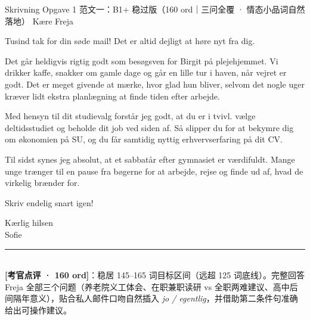 \begin{emailbox}{Skrivning Opgave 1 范文一：B1+ 稳过版（160 ord｜三问全覆 · 情态小品词自然落地）}
Kære Freja

\vspace{0.25em}
Tusind tak for din søde mail! Det er  altid dejligt at høre nyt fra dig.

\vspace{0.25em}
Det går heldigvis rigtig godt som besøgsven for Birgit på plejehjemmet. Vi drikker kaffe, snakker om gamle dage og går en lille tur i haven, når vejret er godt. Det er  meget givende at mærke, hvor glad hun bliver, selvom det nogle uger kræver lidt ekstra planlægning at finde tiden efter arbejde.

\vspace{0.25em}
Med hensyn til dit studievalg forstår jeg godt, at du er i tvivl.  vælge deltidsstudiet og beholde dit job ved siden af. Så slipper du  for at bekymre dig om økonomien på SU, og du får samtidig nyttig erhvervserfaring på dit CV.

\vspace{0.25em}
Til sidst synes jeg absolut, at et sabbatår efter gymnasiet er værdifuldt. Mange unge trænger til en pause fra bøgerne for at arbejde, rejse og finde ud af, hvad de virkelig brænder for.

\vspace{0.25em}
Skriv endelig snart igen!

\vspace{0.25em}
Kærlig hilsen\\
Sofie

\vspace{0.3em}
\rule{\linewidth}{0.4pt}\\[0.2em]
\small\textbf{\color{NCDTeal}[考官点评 · 160 ord]}：稳居 145--165 词目标区间（远超 125 词底线）。完整回答 Freja 全部三个问题（养老院义工体会、在职兼职读研 vs 全职两难建议、高中后间隔年意义），贴合私人邮件口吻自然插入 \textit{jo / egentlig}，并借助第二条件句准确给出可操作建议。
\end{emailbox}

